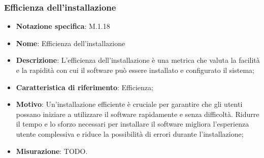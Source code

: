 \subsubsection{Efficienza dell'installazione}
\begin{itemize}
    \item \textbf{Notazione specifica}: M.1.18
    \item \textbf{Nome}: Efficienza dell'installazione
    \item \textbf{Descrizione}: L'efficienza dell'installazione è una metrica che valuta la facilità e la rapidità con cui il software può essere installato e configurato il sistema;
    \item \textbf{Caratteristica di riferimento}: Efficienza;
    \item \textbf{Motivo}: Un'installazione efficiente è cruciale per garantire che gli utenti possano iniziare a utilizzare il software rapidamente e senza difficoltà. Ridurre il tempo e lo sforzo necessari per installare il software migliora l'esperienza utente complessiva e riduce la possibilità di errori durante l'installazione;
    \item \textbf{Misurazione}: TODO.
\end{itemize}
